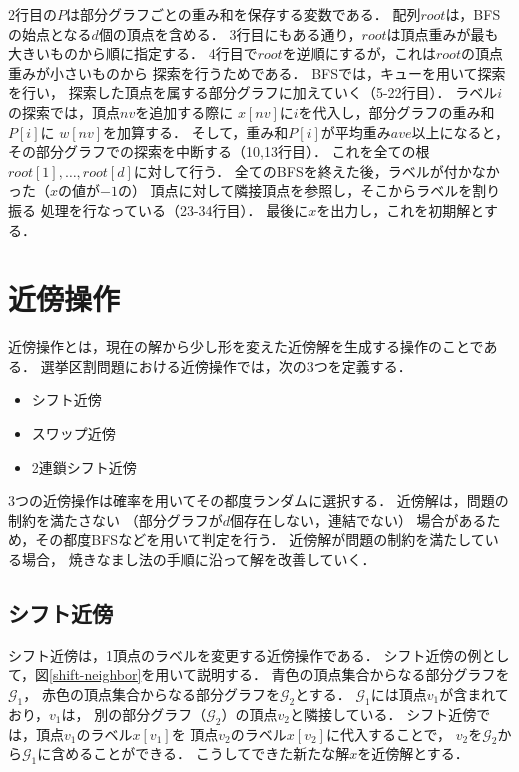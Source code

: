 2行目の$P$は部分グラフごとの重み和を保存する変数である．
配列$root$は，BFSの始点となる$d$個の頂点を含める．
3行目にもある通り，$root$は頂点重みが最も大きいものから順に指定する．
4行目で$root$を逆順にするが，これは$root$の頂点重みが小さいものから
探索を行うためである．
BFSでは，キューを用いて探索を行い，
探索した頂点を属する部分グラフに加えていく（5-22行目）．
ラベル$i$の探索では，頂点$nv$を追加する際に
$x[nv]$に$i$を代入し，部分グラフの重み和$P[i]$に
$w[nv]$を加算する．
そして，重み和$P[i]$が平均重み$ave$以上になると，
その部分グラフでの探索を中断する（10,13行目）．
これを全ての根$root[1],\ldots,root[d]$に対して行う．
全てのBFSを終えた後，ラベルが付かなかった（$x$の値が$-1$の）
頂点に対して隣接頂点を参照し，そこからラベルを割り振る
処理を行なっている（23-34行目）．
最後に$x$を出力し，これを初期解とする．

\section{近傍操作}

近傍操作とは，現在の解から少し形を変えた近傍解を生成する操作のことである．
選挙区割問題における近傍操作では，次の3つを定義する．
\begin{itemize}
  \item シフト近傍
  \item スワップ近傍
  \item 2連鎖シフト近傍
\end{itemize}

3つの近傍操作は確率を用いてその都度ランダムに選択する．
近傍解は，問題の制約を満たさない
（部分グラフが$d$個存在しない，連結でない）
場合があるため，その都度BFSなどを用いて判定を行う．
近傍解が問題の制約を満たしている場合，
焼きなまし法の手順に沿って解を改善していく．

\subsection{シフト近傍}

シフト近傍は，1頂点のラベルを変更する近傍操作である．
シフト近傍の例として，図\ref{shift-neighbor}を用いて説明する．
青色の頂点集合からなる部分グラフを$\mathcal{G}_1$，
赤色の頂点集合からなる部分グラフを$\mathcal{G}_2$とする．
$\mathcal{G}_1$には頂点$v_1$が含まれており，$v_1$は，
別の部分グラフ（$\mathcal{G}_2$）の頂点$v_2$と隣接している．
シフト近傍では，頂点$v_1$のラベル$x[v_1]$を
頂点$v_2$のラベル$x[v_2]$に代入することで，
$v_2$を$\mathcal{G}_2$から$\mathcal{G}_1$に含めることができる．
こうしてできた新たな解$x$を近傍解とする．

